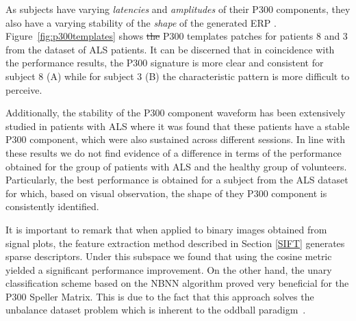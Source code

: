 \documentclass[utf8]{frontiersSCNS} %
\providecommand{\DIFaddtex}[1]{{\protect\color{blue}\uwave{#1}}} %
\providecommand{\DIFdeltex}[1]{{\protect\color{red}\sout{#1}}}                      %
\providecommand{\DIFaddbegin}{} %
\providecommand{\DIFaddend}{} %
\providecommand{\DIFdelbegin}{} %
\providecommand{\DIFdelend}{} %
\providecommand{\DIFadd}[1]{\texorpdfstring{\DIFaddtex{#1}}{#1}} %
\providecommand{\DIFdel}[1]{\texorpdfstring{\DIFdeltex{#1}}{}} %
\begin{document}

As subjects have varying \textit{latencies} and \textit{amplitudes} of their P300 components, they also have a varying stability of the \textit{shape} of the generated ERP \citep{Nam2010}.  Figure~\ref{fig:p300templates} shows \DIFdelbegin \DIFdel{the }\DIFdelend \DIFaddbegin \DIFadd{10 sample }\DIFaddend P300 templates patches for patients 8 and 3 from the dataset of ALS patients. It can be discerned that in coincidence with the performance results, the P300 signature is more clear and consistent for subject 8 (A) while for subject 3 (B) the characteristic pattern is more difficult to perceive.

Additionally, the stability of the P300 component waveform has been extensively studied in patients with ALS \citep{SellersandEmanuelDonchin2006,TomohiroMadarame2008,Nijboer2009,Mak2012,McCane2015} where it was found that these patients have a stable P300 component, which were also sustained across different sessions.  In line with these results we do not find evidence of a difference in terms of the performance obtained for the group of patients with ALS and the healthy group of volunteers. Particularly, the best performance is obtained for a subject from the ALS dataset for which, based on visual observation, the shape of they P300 component is consistently identified.


It is important to remark that when applied to binary images obtained from signal plots, the feature extraction method described in Section \ref{SIFT} generates sparse descriptors.  Under this subspace we found that using the cosine metric yielded a significant performance improvement. On the other hand, the unary classification scheme based on the NBNN algorithm proved very beneficial for the P300 Speller Matrix.  This is due to the fact that this approach solves the unbalance dataset problem which is inherent to the oddball paradigm~\citep{Tibon2015}.  

\end{document}
